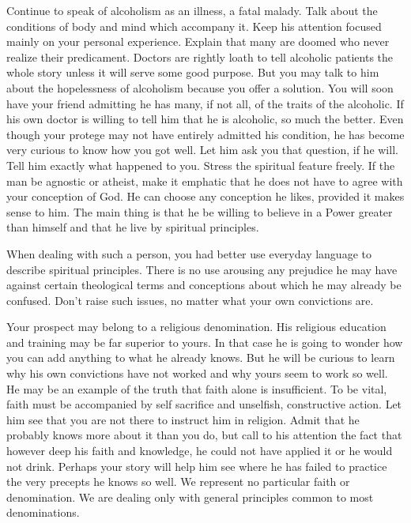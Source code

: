 \begin{biblechapter}
Continue to speak of alcoholism as an illness, a fatal malady.  Talk about the conditions of body and mind which accompany it.  Keep his attention focused mainly on your personal experience.  Explain that many are doomed who never realize their predicament.  Doctors are rightly loath to tell alcoholic patients the whole story unless it will serve some good purpose.  But you may talk to him about the hopelessness of alcoholism because you offer a solution.  You will soon have your friend admitting he has many, if not all, of the traits of the alcoholic.  If his own doctor is willing to tell him that he is alcoholic, so much the better.  Even though your protege may not have entirely admitted his condition, he has become very curious to know how you got well.  Let him ask you that question, if he will.  Tell him exactly what happened to you.  Stress the spiritual feature freely.  If the man be agnostic or atheist, make it emphatic that he does not have to agree with your conception of God.  He can choose any conception he likes, provided it makes sense to him.  The main thing is that he be willing to believe in a Power greater than himself and that he live by spiritual principles.

When dealing with such a person, you had better use everyday language to describe spiritual principles.  There is no use arousing any prejudice he may have against certain theological terms and conceptions about which he may already be confused.  Don't raise such issues, no matter what your own convictions are.

Your prospect may belong to a religious denomination.  His religious education and training may be far superior to yours.  In that case he is going to wonder how you can add anything to what he already knows.  But he will be curious to learn why his own convictions have not worked and why yours seem to work so well.  He may be an example of the truth that faith alone is insufficient.  To be vital, faith must be accompanied by self sacrifice and unselfish, constructive action.  Let him see that you are not there to instruct him in religion.  Admit that he probably knows more about it than you do, but call to his attention the fact that however deep his faith and knowledge, he could not have applied it or he would not drink.  Perhaps your story will help him see where he has failed to practice the very precepts he knows so well.  We represent no particular faith or denomination.  We are dealing only with general principles common to most denominations.


\end{biblechapter}
